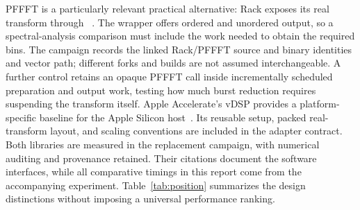 PFFFT is a particularly relevant practical alternative: Rack exposes its real
transform through ~\cite{pffft}. The wrapper offers ordered
and unordered output, so a spectral-analysis comparison must include the work
needed to obtain the required bins. The campaign records the linked Rack/PFFFT
source and binary identities and vector path; different forks and builds are
not assumed interchangeable. A further control retains an opaque PFFFT call
inside incrementally scheduled preparation and output work, testing how much
burst reduction requires suspending the transform itself. Apple Accelerate's
vDSP provides a platform-specific baseline for the Apple Silicon
host~\cite{vdsp}. Its reusable setup, packed real-transform layout, and scaling
conventions are included in the adapter contract. Both libraries are measured
in the replacement campaign, with numerical auditing and provenance retained.
Their citations document the software interfaces, while all comparative
timings in this report come from the accompanying experiment.
Table~\ref{tab:position} summarizes the design distinctions without imposing
a universal performance ranking.


